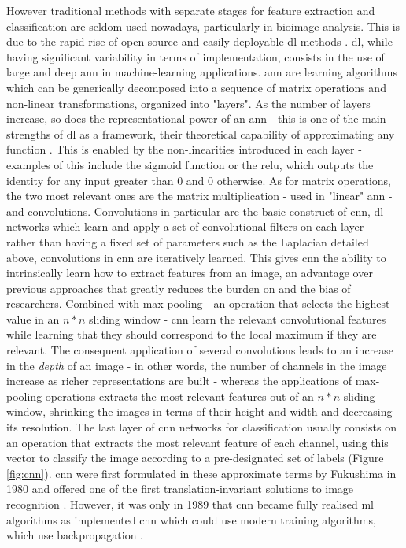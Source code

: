 However traditional methods with separate stages for feature extraction and classification are seldom used nowadays, particularly in bioimage analysis. This is due to the rapid rise of open source and easily deployable \ac{dl} methods \cite{Lucas2021-hc}. \Ac{dl}, while having significant variability in terms of implementation, consists in the use of large and deep \ac{ann} in machine-learning applications. \Ac{ann} are learning algorithms which can be generically decomposed into a sequence of matrix operations and non-linear transformations, organized into "layers". As the number of layers increase, so does the representational power of an \ac{ann} - this is one of the main strengths of \ac{dl} as a framework, their theoretical capability of approximating any function \cite{Nielsen2015-wn}. This is enabled by the non-linearities introduced in each layer - examples of this include the sigmoid function or the \ac{relu}, which outputs the identity for any input greater than $0$ and $0$ otherwise. As for matrix operations, the two most relevant ones are the matrix multiplication - used in "linear" \ac{ann} - and convolutions. Convolutions in particular are the basic construct of \ac{cnn}, \ac{dl} networks which learn and apply a set of convolutional filters on each layer - rather than having a fixed set of parameters such as the Laplacian detailed above, convolutions in \ac{cnn} are iteratively learned. This gives \ac{cnn} the ability to intrinsically learn how to extract features from an image, an advantage over previous approaches that greatly reduces the burden on and the bias of researchers. Combined with max-pooling - an operation that selects the highest value in an $n*n$ sliding window - \ac{cnn} learn the relevant convolutional features while learning that they should correspond to the local maximum if they are relevant. The consequent application of several convolutions leads to an increase in the \textit{depth} of an image - in other words, the number of channels in the image increase as richer representations are built - whereas the applications of max-pooling operations extracts the most relevant features out of an $n*n$ sliding window, shrinking the images in terms of their height and width and decreasing its resolution. The last layer of \ac{cnn} networks for classification usually consists on an operation that extracts the most relevant feature of each channel, using this vector to classify the image according to a pre-designated set of labels (Figure \ref{fig:cnn}). \ac{cnn} were first formulated in these approximate terms by Fukushima in 1980 and offered one of the first translation-invariant solutions to image recognition \cite{Fukushima1980-bk}. However, it was only in 1989 that \ac{cnn} became fully realised \ac{ml} algorithms as  implemented \ac{cnn} which could use modern training algorithms, which use backpropagation \cite{LeCun1989-ro}. 

